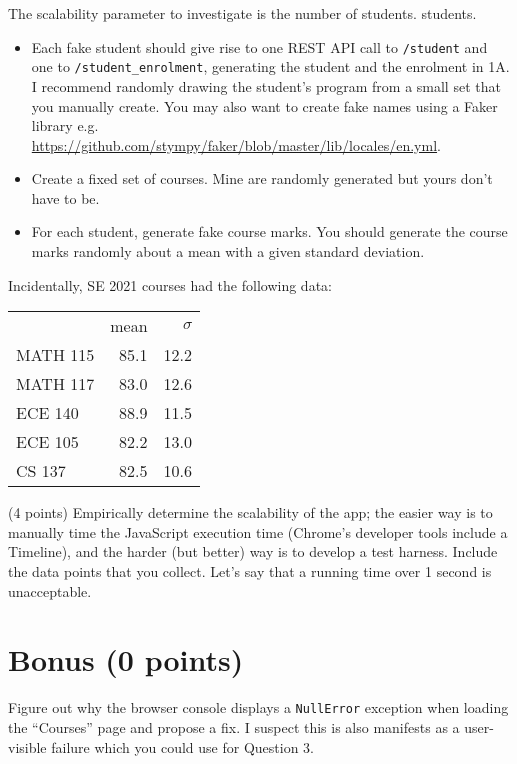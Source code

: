 \documentclass[10pt,hidelinks]{article}
\begin{document}
The scalability parameter to investigate is the number of students.
students.  
\begin{itemize}
\item Each fake student should give rise to one REST API call to
{\tt /student} and one to {\tt /student\_enrolment}, generating the
student and the enrolment in 1A. I recommend randomly drawing the
student's program from a small set that you manually create. 
You may also want to create fake names using a Faker library e.g.
\url{https://github.com/stympy/faker/blob/master/lib/locales/en.yml}.
\item Create a fixed set of courses. Mine are randomly generated but
yours don't have to be. 
\item For each student, generate fake course marks. 
You should generate the course marks randomly about a mean with a given
standard deviation.
\end{itemize}

Incidentally, SE 2021 courses had the following data: 

\begin{center}
\begin{tabular}{lrr}
& mean & $\sigma$\\
MATH 115 & 85.1 & 12.2 \\
MATH 117 & 83.0 & 12.6 \\
ECE 140 & 88.9 & 11.5 \\
ECE 105 & 82.2 & 13.0 \\
CS 137 & 82.5 & 10.6
\end{tabular}
\end{center}

(4 points) Empirically determine the scalability of the app; the easier way is to
manually time the JavaScript execution time (Chrome's developer tools
include a Timeline), and the harder (but better) way is to develop a
test harness.  Include the data points that you collect. Let's say
that a running time over 1 second is unacceptable.

\section*{Bonus (0 points)}
Figure out why the browser console displays a {\tt NullError} exception
when loading the ``Courses'' page and propose a fix.
I suspect this is also manifests as a user-visible failure which
you could use for Question 3.
\end{document}
